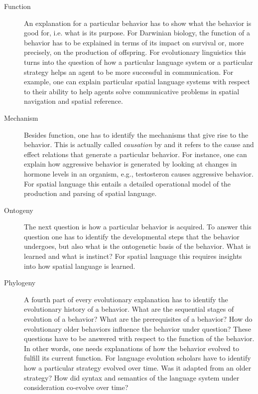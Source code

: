 \begin{description} 
\item[Function] An explanation for a particular behavior has to show what
the behavior is good for, i.e. what is its purpose. For Darwinian biology, 
the function of a behavior has to be explained in terms of its impact 
on survival or, more precisely, on the production of offspring. For evolutionary
linguistics this turns into the question of how a particular language system or a particular strategy
helps an agent to be more successful in communication. For example,
one can explain particular spatial language systems with respect to their ability
to help agents solve communicative problems in spatial navigation and 
spatial reference.

\item[Mechanism] Besides function, one has to identify the mechanisms that give rise 
to the behavior. 
This is actually called \emph{causation} by \cite{tinbergen1963aims} 
and it refers to the cause and effect relations that generate a particular behavior. 
For instance, one can explain how aggressive behavior is generated by looking
at changes in hormone levels in an organism, e.g., testosteron causes aggressive behavior.
For spatial language this entails a detailed operational model of the 
production and parsing of spatial language.

\item[Ontogeny] The next question is how a particular behavior is acquired. To
answer this question one has to identify the developmental steps that
the behavior undergoes, but also what is the ontogenetic basis 
of the behavior. What is learned and what is instinct? For spatial language this 
requires insights into how spatial language is learned.

\item[Phylogeny] A fourth part of every evolutionary explanation has to
identify the evolutionary history of a behavior. What are
the sequential stages of evolution of a behavior? What are the prerequisites
of a behavior? How do evolutionary older behaviors influence 
the behavior under question? These questions have to be answered
with respect to the function of the behavior. In other words, one needs
explanations of how the behavior evolved to fulfill its current function. 
For language evolution scholars have to identify how a particular strategy 
evolved over time. Was it adapted from an older strategy? 
How did syntax and semantics of the language system under consideration co-evolve over time?
\end{description}

